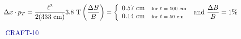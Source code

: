 \documentclass[compress]{beamer}
\begin{document}
\begin{frame}

\vspace{-1 cm}
\[ \hspace{-0.75 cm} \Delta x \cdot p_T = \frac{\ell^2}{2 (333~\mbox{cm})} 3.8~\mbox{T} \left(\frac{\Delta B}{B}\right) = \left\{\begin{array}{l l} 0.57~\mbox{cm} & \mbox{\scriptsize for $\ell$ = 100~cm} \\ 0.14~\mbox{cm} & \mbox{\scriptsize for $\ell$ = 50~cm} \end{array} \right. \mbox{ and } \frac{\Delta B}{B} = 1\% \]

\vspace{-0.25 cm}
\hfill \textcolor{darkblue}{\scriptsize CRAFT-10}

\vspace{0.25 cm}
\end{frame}
\end{document}
